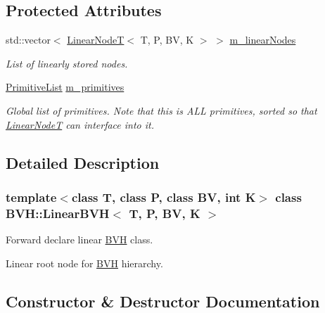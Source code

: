 \subsection*{Protected Attributes}
\begin{DoxyCompactItemize}
\item 
\mbox{\label{classBVH_1_1LinearBVH_aa6b833445964d75b5b560ece4548a044}} 
std\+::vector$<$ \hyperlink{classBVH_1_1LinearNodeT}{Linear\+NodeT}$<$ T, P, BV, K $>$ $>$ \hyperlink{classBVH_1_1LinearBVH_aa6b833445964d75b5b560ece4548a044}{m\+\_\+linear\+Nodes}
\begin{DoxyCompactList}\small\item\em List of linearly stored nodes. \end{DoxyCompactList}\item 
\mbox{\label{classBVH_1_1LinearBVH_a82d8ebdc93553c7b02fe4da77329a4c2}} 
\hyperlink{classBVH_1_1LinearBVH_a94ee5da1670e2ef85eeabf7cf6a2da92}{Primitive\+List} \hyperlink{classBVH_1_1LinearBVH_a82d8ebdc93553c7b02fe4da77329a4c2}{m\+\_\+primitives}
\begin{DoxyCompactList}\small\item\em Global list of primitives. Note that this is A\+LL primitives, sorted so that \hyperlink{classBVH_1_1LinearNodeT}{Linear\+NodeT} can interface into it. \end{DoxyCompactList}\end{DoxyCompactItemize}


\subsection{Detailed Description}
\subsubsection*{template$<$class T, class P, class BV, int K$>$\newline
class B\+V\+H\+::\+Linear\+B\+V\+H$<$ T, P, B\+V, K $>$}

Forward declare linear \hyperlink{namespaceBVH}{B\+VH} class. 

Linear root node for \hyperlink{namespaceBVH}{B\+VH} hierarchy. 

\subsection{Constructor \& Destructor Documentation}
\mbox{\label{classBVH_1_1LinearBVH_a82e767c16424e19c5dfbe671dd111e32}} 
